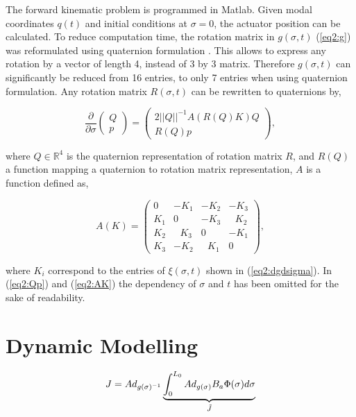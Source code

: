 The forward kinematic problem is programmed in Matlab. Given modal coordinates $q(t)$ and initial conditions at $\sigma = 0$, the actuator position can be calculated. To reduce computation time, the rotation matrix in $g(\sigma,t)$ (\ref{eq2:g}) was reformulated using quaternion formulation \cite{Boyer2019}. This allows to express any rotation by a vector of length 4, instead of 3 by 3 matrix. Therefore $g(\sigma,t)$ can significantly be reduced from 16 entries, to only 7 entries when using quaternion formulation. Any rotation matrix $R(\sigma,t)$ can be rewritten to quaternions by,


\begin{equation}
\frac{\partial}{\partial \sigma}    \begin{pmatrix} Q \\ p \end{pmatrix} = \begin{pmatrix} 2 ||Q||^{-1} A(R(Q)K)Q \\ R(Q)p \end{pmatrix},
\label{eq2:Qp}
\end{equation}

where $Q \in \mathbb{R}^4$ is the quaternion representation of rotation matrix $R$, and $R(Q)$ a function mapping a quaternion to rotation matrix representation, $A$ is a function defined as,


\begin{equation}
    A(K) = \begin{pmatrix} 0 & -K_1 & -K_2 & -K_3 \\ K_1 & 0 & -K_3 & \hspace{8pt}K_2 \\ K_2 & \hspace{8pt}K_3 & 0 & -K_1 \\ K_3 & -K_2 & \hspace{8pt}K_1 & 0 \end{pmatrix},
    \label{eq2:AK}
\end{equation}

where $K_i$ correspond to the entries of $\xi(\sigma,t)$ shown in (\ref{eq2:dgdsigma}). In  (\ref{eq2:Qp}) and (\ref{eq2:AK}) the dependency of $\sigma$ and $t$ has been omitted for the sake of readability.


\section{Dynamic Modelling}


\begin{equation}
    J = Ad_{g(\sigma)^{-1}} \underbrace{\int_0^{L_0} Ad_{g(\sigma)} B_a \Phi(\sigma) d\sigma}_{\Tilde{J}}
\end{equation}


